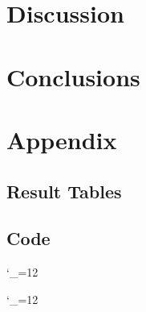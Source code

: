 \documentclass[11pt]{article}
\newcommand{\code}{\begingroup
  \catcode`_=12 \docode}
\newcommand{\docode}[2]{
	\begin{framed}
	\end{framed}\endgroup}
\begin{document}
\section{Discussion}
\label{sec:discussion}

\section{Conclusions}
\label{sec:conclusions}


\nocite{*}



\section*{Appendix}
\subsection*{Result Tables}
\subsection*{Code}
\code{../onetree.h}{C++}
\code{../onetree.cpp}{C++}


\end{document}
